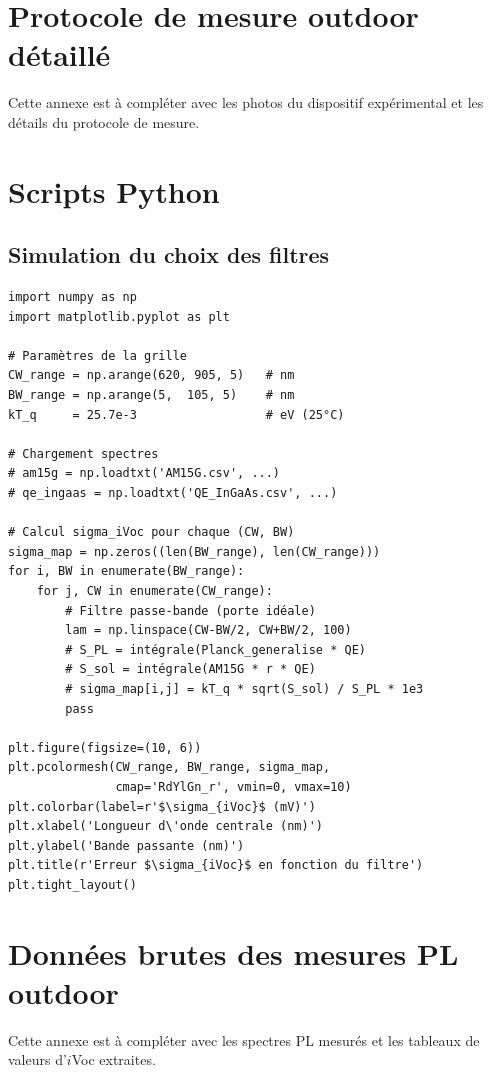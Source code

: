\documentclass[12pt,a4paper]{report}
\begin{document}
\appendix

\chapter{Protocole de mesure outdoor détaillé}

\begin{encadre}[title={Note}]
Cette annexe est à compléter avec les photos du dispositif expérimental et les détails du protocole de mesure.
\end{encadre}

\chapter{Scripts Python}

\section*{Simulation du choix des filtres}

\begin{verbatim}
import numpy as np
import matplotlib.pyplot as plt

# Paramètres de la grille
CW_range = np.arange(620, 905, 5)   # nm
BW_range = np.arange(5,  105, 5)    # nm
kT_q     = 25.7e-3                  # eV (25°C)

# Chargement spectres
# am15g = np.loadtxt('AM15G.csv', ...)
# qe_ingaas = np.loadtxt('QE_InGaAs.csv', ...)

# Calcul sigma_iVoc pour chaque (CW, BW)
sigma_map = np.zeros((len(BW_range), len(CW_range)))
for i, BW in enumerate(BW_range):
    for j, CW in enumerate(CW_range):
        # Filtre passe-bande (porte idéale)
        lam = np.linspace(CW-BW/2, CW+BW/2, 100)
        # S_PL = intégrale(Planck_generalise * QE)
        # S_sol = intégrale(AM15G * r * QE)
        # sigma_map[i,j] = kT_q * sqrt(S_sol) / S_PL * 1e3
        pass

plt.figure(figsize=(10, 6))
plt.pcolormesh(CW_range, BW_range, sigma_map,
               cmap='RdYlGn_r', vmin=0, vmax=10)
plt.colorbar(label=r'$\sigma_{iVoc}$ (mV)')
plt.xlabel('Longueur d\'onde centrale (nm)')
plt.ylabel('Bande passante (nm)')
plt.title(r'Erreur $\sigma_{iVoc}$ en fonction du filtre')
plt.tight_layout()
\end{verbatim}

\chapter{Données brutes des mesures PL outdoor}

\begin{encadre}[title={Note}]
Cette annexe est à compléter avec les spectres PL mesurés et les tableaux de valeurs d'$i$Voc extraites.
\end{encadre}
\end{document}

